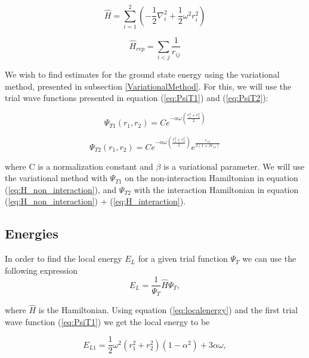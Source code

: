 \documentclass[norsk,a4paper,12pt]{article}
\begin{document}
\begin{equation}
    \hat{H} = \sum_{i=1}^{2} (-\frac{1}{2}\nabla_i^2 + \frac{1}{2} \omega^2r_i^2) 
    \label{eq:H_non_interaction}
\end{equation}

\begin{equation}
    \hat{H}_{rep} = \sum_{i<j} \frac{1}{r_{ij}}
    \label{eq:H_interaction}
\end{equation}

We wish to find estimates for the ground state energy using the variational method, presented in subsection \ref{VariationalMethod}. For this, we will use the trial wave functions presented in equation (\ref{eq:PsiT1}) and (\ref{eq:PsiT2}):

\begin{equation}
    \Psi_{T1} (r_1, r_2) = Ce^{-\alpha \omega (\frac{r_1^2 + r_2^2}{2})}
    \label{eq:PsiT1}
\end{equation}

\begin{equation}
    \Psi_{T2}(r_1, r_2) = Ce^{-\alpha \omega (\frac{r_1^2 + r_2^2}{2})}e^{\frac{r_{12}}{2(1+\beta r_{12})}}
    \label{eq:PsiT2}
\end{equation}

where C is a normalization constant and $\beta$ is a variational parameter. We will use the variational method with $\Psi_{T1}$ on the non-interaction Hamiltonian in equation (\ref{eq:H_non_interaction}), and $\Psi_{T2}$ with the interaction Hamiltonian in equation (\ref{eq:H_non_interaction}) + (\ref{eq:H_interaction}).

\subsection{Energies} \label{Energies}
In order to find the local energy $E_L$ for a given trial function $\Psi_T$ we can use the following expression
\begin{equation}
E_L = \frac{1}{\Psi_T}\hat{H}\Psi_T,
\label{eq:localenergy}
\end{equation}

where $\hat{H}$ is the Hamiltonian. Using equation (\ref{eq:localenergy}) and the first trial wave function (\ref{eq:PsiT1}) we get the local energy to be

\begin{equation}
E_{L1} = \frac{1}{2}\omega^2 (r_1^2 + r_2^2)(1-\alpha^2) + 3\alpha \omega,
\label{eq:EL1}
\end{equation}
\end{document}
